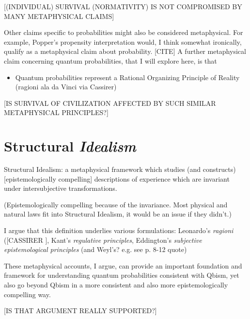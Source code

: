 [(INDIVIDUAL) SURVIVAL (NORMATIVITY) IS NOT COMPROMISED BY MANY METAPHYSICAL CLAIMS]


Other claims specific to probabilities might also be considered metaphysical.  For example, Popper's propensity interpretation would, I think somewhat ironically, qualify as a metaphysical claim about probability.  [CITE]  A further metaphysical claim concerning quantum probabilities, that I will explore here, is that 

\begin{itemize}
    \item Quantum probabilities represent a Rational Organizing Principle of Reality (ragioni ala da Vinci via Cassirer)
\end{itemize}

[IS SURVIVAL OF CIVILIZATION AFFECTED BY SUCH SIMILAR METAPHYSICAL PRINCIPLES?]




\section{Structural \emph{Idealism}}

Structural Idealism: a metaphysical framework which studies (and constructs) [epistemologically compelling] descriptions of experience which are invariant under intersubjective transformations.

(Epistemologically compelling because of the invariance.  Most physical and natural laws fit into Structural Idealism, it would be an issue if they didn't.)

I argue that this definition underlies various formulations: Leonardo's \emph{ragioni} ([CASSIRER \citep{Cassirer1927}], Kant's \emph{regulative principles}, Eddington's \emph{subjective epistemological principles} (and Weyl's? e.g. see \citep{Ryckman2005} p. 8-12 quote)

These metaphysical accounts, I argue, can provide an important foundation and framework for understanding quantum probabilities consistent with Qbism, yet also go beyond Qbism in a more consistent and also more epistemologically compelling way.

[IS THAT ARGUMENT REALLY SUPPORTED?]

